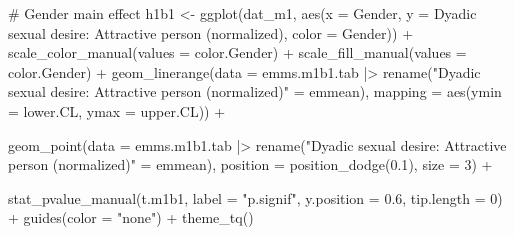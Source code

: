 \documentclass[
  bookmarksnumbered]{article}
\newenvironment{Shaded}{\begin{snugshade}}{\end{snugshade}}
\newcommand{\AttributeTok}[1]{\textcolor[rgb]{0.80,0.80,0.80}{#1}}
\newcommand{\CommentTok}[1]{\textcolor[rgb]{0.50,0.62,0.50}{#1}}
\newcommand{\DecValTok}[1]{\textcolor[rgb]{0.86,0.86,0.80}{#1}}
\newcommand{\FloatTok}[1]{\textcolor[rgb]{0.75,0.75,0.82}{#1}}
\newcommand{\FunctionTok}[1]{\textcolor[rgb]{0.94,0.94,0.56}{#1}}
\newcommand{\NormalTok}[1]{\textcolor[rgb]{0.80,0.80,0.80}{#1}}
\newcommand{\OtherTok}[1]{\textcolor[rgb]{0.94,0.94,0.56}{#1}}
\newcommand{\SpecialCharTok}[1]{\textcolor[rgb]{0.86,0.64,0.64}{#1}}
\newcommand{\StringTok}[1]{\textcolor[rgb]{0.80,0.58,0.58}{#1}}
\begin{document}
\begin{Shaded}
\begin{Highlighting}[]
\CommentTok{\# Gender main effect}
\NormalTok{h1b1 }\OtherTok{\textless{}{-}} \FunctionTok{ggplot}\NormalTok{(dat\_m1, }\FunctionTok{aes}\NormalTok{(}\AttributeTok{x =}\NormalTok{ Gender, }\AttributeTok{y =} \StringTok{\textasciigrave{}}\AttributeTok{Dyadic sexual desire: Attractive person (normalized)}\StringTok{\textasciigrave{}}\NormalTok{, }
                          \AttributeTok{color =}\NormalTok{ Gender)) }\SpecialCharTok{+}
  \FunctionTok{scale\_color\_manual}\NormalTok{(}\AttributeTok{values =}\NormalTok{ color.Gender) }\SpecialCharTok{+}
  \FunctionTok{scale\_fill\_manual}\NormalTok{(}\AttributeTok{values =}\NormalTok{ color.Gender) }\SpecialCharTok{+}
  \FunctionTok{geom\_linerange}\NormalTok{(}\AttributeTok{data =}\NormalTok{ emms.m1b1.tab }\SpecialCharTok{|\textgreater{}} 
                  \FunctionTok{rename}\NormalTok{(}\StringTok{"Dyadic sexual desire: Attractive person (normalized)"} \OtherTok{=}\NormalTok{ emmean),}
                \AttributeTok{mapping =} \FunctionTok{aes}\NormalTok{(}\AttributeTok{ymin =}\NormalTok{ lower.CL, }\AttributeTok{ymax =}\NormalTok{ upper.CL)) }\SpecialCharTok{+}
                
  \FunctionTok{geom\_point}\NormalTok{(}\AttributeTok{data =}\NormalTok{ emms.m1b1.tab }\SpecialCharTok{|\textgreater{}} 
                  \FunctionTok{rename}\NormalTok{(}\StringTok{"Dyadic sexual desire: Attractive person (normalized)"} \OtherTok{=}\NormalTok{ emmean), }
             \AttributeTok{position =} \FunctionTok{position\_dodge}\NormalTok{(}\FloatTok{0.1}\NormalTok{), }
             \AttributeTok{size =} \DecValTok{3}\NormalTok{) }\SpecialCharTok{+}
             
  \FunctionTok{stat\_pvalue\_manual}\NormalTok{(t.m1b1, }
                     \AttributeTok{label =} \StringTok{"p.signif"}\NormalTok{, }
                     \AttributeTok{y.position =} \FloatTok{0.6}\NormalTok{, }
                     \AttributeTok{tip.length =} \DecValTok{0}\NormalTok{) }\SpecialCharTok{+}
  \FunctionTok{guides}\NormalTok{(}\AttributeTok{color =} \StringTok{"none"}\NormalTok{) }\SpecialCharTok{+}
  \FunctionTok{theme\_tq}\NormalTok{()}


\end{Highlighting}
\end{Shaded}
\end{document}
